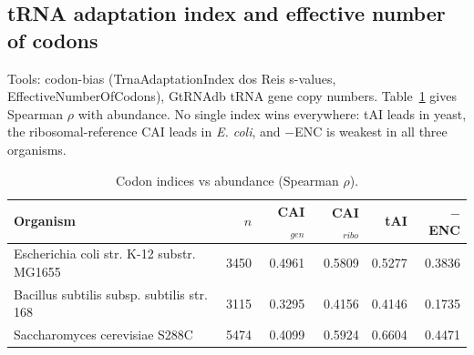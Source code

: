 \subsection{tRNA adaptation index and effective number of codons}
Tools: codon-bias (TrnaAdaptationIndex dos Reis s-values, EffectiveNumberOfCodons), GtRNAdb tRNA gene copy numbers. Table~\ref{tab:tai} gives Spearman $\rho$ with abundance. No single index wins everywhere: tAI leads in yeast, the ribosomal-reference CAI leads in \textit{E. coli}, and $-$ENC is weakest in all three organisms.
\begin{table}[h]\centering\small\caption{Codon indices vs abundance (Spearman $\rho$).}\label{tab:tai}\begin{tabular}{p{5cm}rrrrr}\hline Organism & $n$ & CAI$_{gen}$ & CAI$_{ribo}$ & tAI & $-$ENC\\\hline
Escherichia coli str. K-12 substr. MG1655 & 3450 & 0.4961 & 0.5809 & 0.5277 & 0.3836\\
Bacillus subtilis subsp. subtilis str. 168 & 3115 & 0.3295 & 0.4156 & 0.4146 & 0.1735\\
Saccharomyces cerevisiae S288C & 5474 & 0.4099 & 0.5924 & 0.6604 & 0.4471\\
\hline\end{tabular}\end{table}
